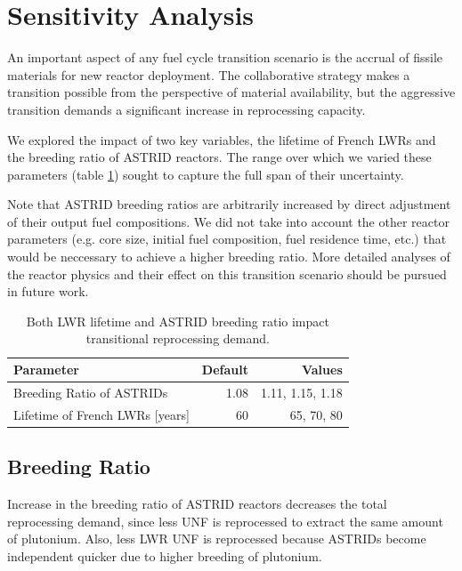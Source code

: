 \section{Sensitivity Analysis}

An important aspect of any fuel cycle transition scenario
is the accrual of fissile materials for new reactor deployment.
The collaborative strategy makes a transition possible 
from the perspective of material availability,
but the aggressive transition demands a significant increase in reprocessing capacity.

We explored the impact of two key variables, the lifetime of French \glspl{LWR} and the
breeding ratio of \gls{ASTRID} reactors. The range over which we varied these parameters (table \ref{tab:sen_par})
sought to capture the full span of their uncertainty.

Note that \gls{ASTRID} breeding ratios are arbitrarily increased
by direct adjustment of their output fuel compositions. We did not 
take into account the other reactor parameters (e.g. core size, initial
fuel composition, fuel residence time, etc.)
that would be neccessary to achieve a higher breeding ratio. More detailed analyses
of the reactor physics and their effect on this transition scenario 
should be pursued in future work.


\begin{table}[h]
    \centering
    \caption{Both \gls{LWR} lifetime and \gls{ASTRID} breeding ratio impact 
    transitional reprocessing demand.}
    \begin{tabularx}{\textwidth}{lrr}
        \hline
        \textbf{Parameter} & \textbf{Default} & \textbf{Values} \\
        \hline
        Breeding Ratio of \glspl{ASTRID} & 1.08 & 1.11, 1.15, 1.18 \\ 
        Lifetime of French \glspl{LWR} [years] & 60  & 65, 70, 80 \\
        \hline
    \end{tabularx}
    \label{tab:sen_par}
\end{table}

\subsection{Breeding Ratio}


Increase in the breeding ratio of \gls{ASTRID} reactors
decreases the total reprocessing demand, since less
\gls{UNF} is reprocessed to extract the same amount of
plutonium. Also, less \gls{LWR} \gls{UNF} is reprocessed
because \glspl{ASTRID} become independent quicker due to
higher breeding of plutonium.

